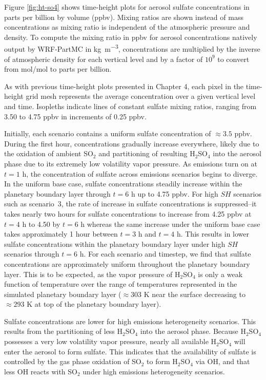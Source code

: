 Figure \ref{fig:ht-so4} shows time-height plots for aerosol sulfate concentrations in parts per billion by volume (ppbv). Mixing ratios are shown instead of mass concentrations as mixing ratio is independent of the atmospheric pressure and density. To compute the mixing ratio in ppbv for aerosol concentrations natively output by WRF-PartMC in \si{kg.m^{-3}}, concentrations are multiplied by the inverse of atmospheric density for each vertical level and by a factor of $10^9$ to convert from mol/mol to parts per billion.

As with previous time-height plots presented in Chapter 4, each pixel in the time-height grid mesh represents the average concentration over a given vertical level and time. Isopleths indicate lines of constant sulfate mixing ratios, ranging from 3.50 to 4.75 ppbv in increments of 0.25 ppbv.

Initially, each scenario contains a uniform sulfate concentration of $\approx3.5$ ppbv. During the first hour, concentrations gradually increase everywhere, likely due to the oxidation of ambient SO$_2$ and partitioning of resulting H$_2$SO$_4$ into the aerosol phase due to its extremely low volatility vapor pressure. As emissions turn on at $t=1$ h, the concentration of sulfate across emissions scenarios begins to diverge. In the uniform base case, sulfate concentrations steadily increase within the planetary boundary layer through $t=6$ h up to 4.75 ppbv. For high $SH$ scenarios such as scenario~3, the rate of increase in sulfate concentrations is suppressed--it takes nearly two hours for sulfate concentrations to increase from 4.25 ppbv at $t=4$ h to 4.50 by $t=6$ h whereas the same increase under the uniform base case takes approximately 1 hour between $t=3$ h and $t=4$ h. This results in lower sulfate concentrations within the planetary boundary layer under high $SH$ scenarios through $t=6$ h. For each scenario and timestep, we find that sulfate concentrations are approximately uniform throughout the planetary boundary layer. This is to be expected, as the vapor pressure of H$_2$SO$_4$ is only a weak function of temperature over the range of temperatures represented in the simulated planetary boundary layer ($\approx303$ K near the surface decreasing to $\approx293$ K at top of the planetary boundary layer).

Sulfate concentrations are lower for high emissions heterogeneity scenarios. This results from the partitioning of less H$_2$SO$_4$ into the aerosol phase. Because H$_2$SO$_4$ possesses a very low volatility vapor pressure, nearly all available H$_2$SO$_4$ will enter the aerosol to form sulfate. This indicates that the availability of sulfate is controlled by the gas phase oxidation of SO$_2$ to form H$_2$SO$_4$ via OH, and that less OH reacts with SO$_2$ under high emissions heterogeneity scenarios. 

